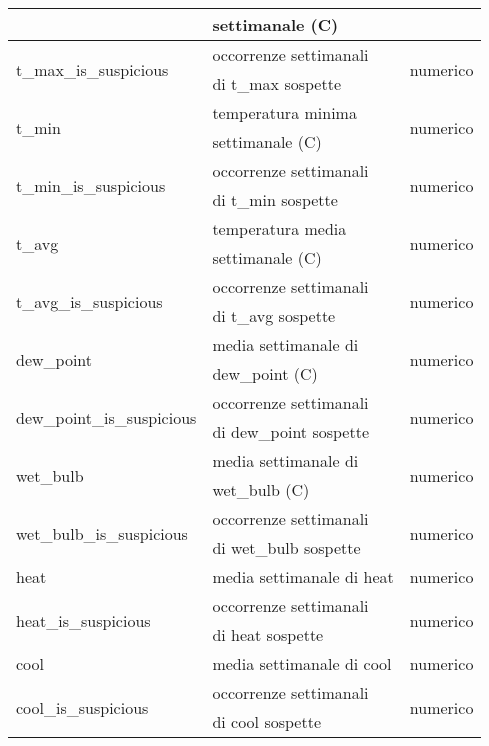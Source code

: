 \begin{longtable}{lll}
	& settimanale (\degree C) & \\ \hline
	\multirow{2}{*}{t\_max\_is\_suspicious}		& occorrenze settimanali   
	&  \multirow{2}{*}{numerico}	 \\
	& di t\_max sospette & 	 \\ \hline	
	\multirow{2}{*}{t\_min}		& temperatura minima  	  & 
	\multirow{2}{*}{numerico}		\\
	& settimanale (\degree C) & \\ \hline
	\multirow{2}{*}{t\_min\_is\_suspicious}	& occorrenze settimanali  &  
	\multirow{2}{*}{numerico}	 \\
	& di t\_min sospette &  \\ \hline		
	\multirow{2}{*}{t\_avg}		& temperatura media  	  & 
	\multirow{2}{*}{numerico}	\\ 
	& settimanale (\degree C) &	\\\hline
	\multirow{2}{*}{t\_avg\_is\_suspicious}	& occorrenze settimanali & 
	\multirow{2}{*}{numerico}	\\ 
	& di t\_avg sospette & \\	\hline		
	\multirow{2}{*}{dew\_point}	& media settimanale di  	 & 	
	\multirow{2}{*}{numerico}	   	\\ 
	& dew\_point (\degree C) &		\\ \hline
	\multirow{2}{*}{dew\_point\_is\_suspicious}		& occorrenze settimanali & 
	\multirow{2}{*}{numerico}	\\
	& di dew\_point sospette &  \\	\hline
	\multirow{2}{*}{wet\_bulb}	& media settimanale di & 	
	\multirow{2}{*}{numerico}	   	\\ 
	& wet\_bulb (\degree C)&\\ \hline
	\multirow{2}{*}{wet\_bulb\_is\_suspicious}		& occorrenze settimanali & 
	\multirow{2}{*}{numerico}	\\ 
	& di wet\_bulb sospette & \\	\hline
	heat	& media settimanale di heat & 	numerico \\	\hline
	\multirow{2}{*}{heat\_is\_suspicious} & occorrenze settimanali & 
	\multirow{2}{*}{numerico}	\\
	& di heat sospette &	\\	\hline		
	cool	& media settimanale di cool & numerico \\	\hline
	\multirow{2}{*}{cool\_is\_suspicious}		& occorrenze settimanali & 
	\multirow{2}{*}{numerico}	\\
	& di cool sospette & \\	\hline		 

\end{longtable}
